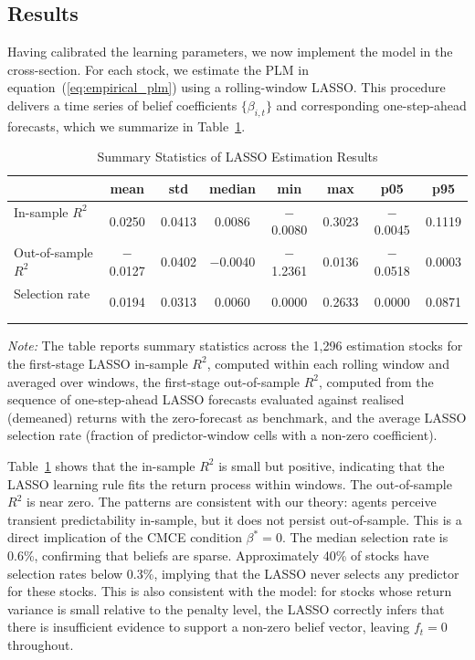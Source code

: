 \documentclass[11pt]{article}
\begin{document}
\subsection{Results}

Having calibrated the learning parameters, we now implement the model in the cross-section.
For each stock, we estimate the PLM in equation~(\ref{eq:empirical_plm}) using a rolling-window LASSO.
This procedure delivers a time series of belief coefficients $\{\beta_{i,t}\}$ and corresponding one-step-ahead forecasts, which we summarize in Table~\ref{tab:summary_stats_lasso}.

\begin{table}[H]
\centering
\caption{Summary Statistics of LASSO Estimation Results}
\label{tab:summary_stats_lasso}
\begin{tabularx}{\textwidth}{@{}>{\small}Xccccccc@{}}
\toprule
 & mean & std & median & min & max & p05 & p95 \\
\midrule
In-sample $R^2$   & 0.0250 & 0.0413 & 0.0086 & $-$0.0080 & 0.3023 & $-$0.0045 & 0.1119 \\
Out-of-sample $R^2$ & $-$0.0127 & 0.0402 & $-$0.0040 & $-$1.2361 & 0.0136 & $-$0.0518 & 0.0003 \\
Selection rate    & 0.0194 & 0.0313 & 0.0060 & 0.0000 & 0.2633 & 0.0000 & 0.0871 \\
\bottomrule
\end{tabularx}
\medskip
\begin{minipage}{\textwidth}
\footnotesize
\textit{Note:} The table reports summary statistics across the 1,296 estimation stocks for the first-stage LASSO in-sample $R^2$, computed within each rolling window and averaged over windows, the first-stage out-of-sample $R^2$, computed from the sequence of one-step-ahead LASSO forecasts evaluated against realised (demeaned) returns with the zero-forecast as benchmark, and the average LASSO selection rate (fraction of predictor-window cells with a non-zero coefficient).
\end{minipage}
\end{table}

Table~\ref{tab:summary_stats_lasso} shows that the in-sample $R^2$ is small but positive, indicating that the LASSO learning rule fits the return process within windows.
The out-of-sample $R^2$ is near zero.
The patterns are consistent with our theory: agents perceive transient predictability in-sample, but it does not persist out-of-sample.
This is a direct implication of the CMCE condition $\beta^* = 0$.
The median selection rate is 0.6\%, confirming that beliefs are sparse.
Approximately 40\% of stocks have selection rates below 0.3\%, implying that the LASSO never selects any predictor for these stocks.
This is also consistent with the model: for stocks whose return variance is small relative to the penalty level, the LASSO correctly infers that there is insufficient evidence to support a non-zero belief vector, leaving $f_t = 0$ throughout.
\end{document}
